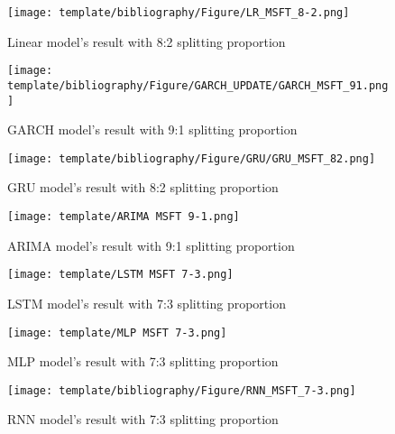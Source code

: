 \documentclass{ieeeojies}
\begin{document}
\begin{figure}[H]
  \centering
  \begin{minipage}{0.8\linewidth}
    \centering
    \texttt{[image: template/bibliography/Figure/LR\_MSFT\_8-2.png]}
    \caption{Linear model's result with 8:2 splitting proportion}
    \label{fig15}
  \end{minipage}
\end{figure}
\begin{figure}[H]
  \centering
  \begin{minipage}{0.8\linewidth}
    \centering
    \texttt{[image: template/bibliography/Figure/GARCH\_UPDATE/GARCH\_MSFT\_91.png]}
    \caption{GARCH model's result with 9:1 splitting proportion}
    \label{fig16}
  \end{minipage}
\end{figure}
\begin{figure}[H]
  \centering
  \begin{minipage}{0.8\linewidth}
    \centering
    \texttt{[image: template/bibliography/Figure/GRU/GRU\_MSFT\_82.png]}
    \caption{GRU model's result with 8:2 splitting proportion}
    \label{fig17}
  \end{minipage}
\end{figure}
\begin{figure}[H]
  \centering
  \begin{minipage}{0.8\linewidth}
    \centering
    \texttt{[image: template/ARIMA MSFT 9-1.png]}
    \caption{ARIMA model's result with 9:1 splitting proportion}
    \label{fig18}
  \end{minipage}
\end{figure}
\begin{figure}[H]
  \centering
  \begin{minipage}{0.8\linewidth}
    \centering
    \texttt{[image: template/LSTM MSFT 7-3.png]}
    \caption{LSTM model's result with 7:3 splitting proportion}
    \label{fig19}
  \end{minipage}
\end{figure}
\begin{figure}[H]
  \centering
  \begin{minipage}{0.8\linewidth}
    \centering
    \texttt{[image: template/MLP MSFT 7-3.png]}
    \caption{MLP model's result with 7:3 splitting proportion}
    \label{fig20}
  \end{minipage}
\end{figure}
\begin{figure}[H]
  \centering
  \begin{minipage}{0.8\linewidth}
    \centering
    \texttt{[image: template/bibliography/Figure/RNN\_MSFT\_7-3.png]}
    \caption{RNN model's result with 7:3 splitting proportion}
    \label{fig21}
  \end{minipage}
\end{figure}
\end{document}
